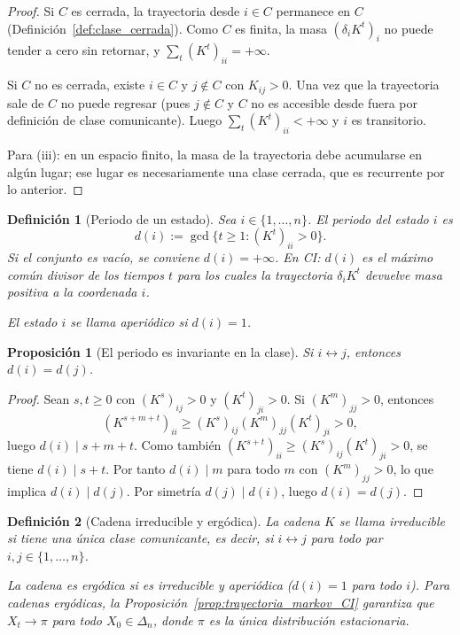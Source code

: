 ﻿\documentclass[12pt]{article}
\newtheorem{definicion}{Definición}[section]
\newtheorem{proposicion}{Proposición}[section]
\begin{document}
\begin{proof}
Si $C$ es cerrada, la trayectoria desde $i\in C$ permanece en $C$ (Definición~\ref{def:clase_cerrada}). Como $C$ es finita, la masa $(\delta_i K^t)_i$ no puede tender a cero sin retornar, y $\sum_t (K^t)_{ii} = +\infty$.

Si $C$ no es cerrada, existe $i\in C$ y $j\notin C$ con $K_{ij}>0$. Una vez que la trayectoria sale de $C$ no puede regresar (pues $j\notin C$ y $C$ no es accesible desde fuera por definición de clase comunicante). Luego $\sum_t (K^t)_{ii}<+\infty$ y $i$ es transitorio.

Para (iii): en un espacio finito, la masa de la trayectoria debe acumularse en algún lugar; ese lugar es necesariamente una clase cerrada, que es recurrente por lo anterior.
\end{proof}

\begin{definicion}[Periodo de un estado]\label{def:periodo}
Sea $i\in\{1,\dots,n\}$. El \emph{periodo} del estado $i$ es
\[
d(i) := \gcd\{t\ge 1 : (K^t)_{ii} > 0\}.
\]
Si el conjunto es vacío, se conviene $d(i)=+\infty$. En CI: $d(i)$ es el máximo común divisor de los tiempos $t$ para los cuales la trayectoria $\delta_i K^t$ devuelve masa positiva a la coordenada $i$.

El estado $i$ se llama \emph{aperiódico} si $d(i)=1$.
\end{definicion}

\begin{proposicion}[El periodo es invariante en la clase]\label{prop:periodo_clase}
Si $i\leftrightarrow j$, entonces $d(i)=d(j)$.
\end{proposicion}

\begin{proof}
Sean $s,t\ge 0$ con $(K^s)_{ij}>0$ y $(K^t)_{ji}>0$. Si $(K^m)_{jj}>0$, entonces
\[
(K^{s+m+t})_{ii} \ge (K^s)_{ij}(K^m)_{jj}(K^t)_{ji} > 0,
\]
luego $d(i)\mid s+m+t$. Como también $(K^{s+t})_{ii}\ge (K^s)_{ij}(K^t)_{ji}>0$, se tiene $d(i)\mid s+t$. Por tanto $d(i)\mid m$ para todo $m$ con $(K^m)_{jj}>0$, lo que implica $d(i)\mid d(j)$. Por simetría $d(j)\mid d(i)$, luego $d(i)=d(j)$.
\end{proof}

\begin{definicion}[Cadena irreducible y ergódica]\label{def:irreducible_ergodica}
La cadena $K$ se llama \emph{irreducible} si tiene una única clase comunicante, es decir, si $i\leftrightarrow j$ para todo par $i,j\in\{1,\dots,n\}$.

La cadena es \emph{ergódica} si es irreducible y aperiódica ($d(i)=1$ para todo $i$). Para cadenas ergódicas, la Proposición~\ref{prop:trayectoria_markov_CI} garantiza que $X_t\to\pi$ para todo $X_0\in\Delta_n$, donde $\pi$ es la única distribución estacionaria.
\end{definicion}
\end{document}
